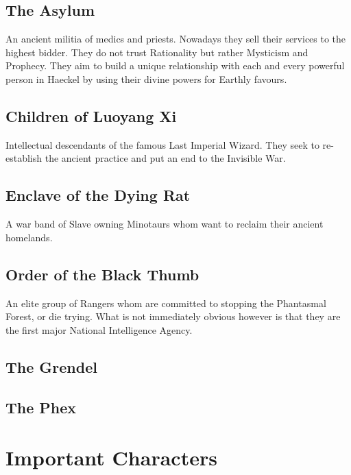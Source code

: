 \begin{multicols}{2}
    \subsection{The Asylum} An ancient militia of medics and priests. Nowadays they sell their services to the highest bidder. They do not trust Rationality but rather Mysticism and Prophecy. They aim to build a unique relationship with each and every powerful person in Haeckel by using their divine powers for Earthly favours.  
    \subsection{Children of Luoyang Xi} Intellectual descendants of the famous Last Imperial Wizard. They seek to re-establish the ancient practice and put an end to the Invisible War.
    \subsection{Enclave of the Dying Rat} A war band of Slave owning Minotaurs whom want to reclaim their ancient homelands.
    \subsection{Order of the Black Thumb} An elite group of Rangers whom are committed to stopping the Phantasmal Forest, or die trying. What is not immediately obvious however is that they are the first major National Intelligence Agency.
    \subsection{The Grendel} 
    \subsection{The Phex} 
\newpage
\section{Important Characters}\label{importantcharacters}




\end{multicols}
